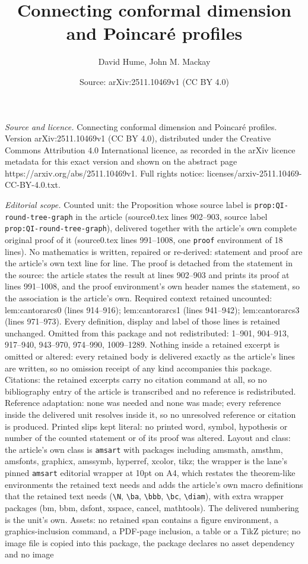\documentclass[10pt,a4paper]{amsart}
\title[Connecting conformal dimension and Poincar\'e profiles]{Connecting conformal dimension and Poincar\'e profiles}
\author{David Hume, John M. Mackay}
\date{Source: arXiv:2511.10469v1 (CC BY 4.0)}
\begin{document}
\maketitle

\noindent\emph{Source and licence.} Connecting conformal dimension and Poincar\'e profiles. Version arXiv:2511.10469v1 (CC BY 4.0), distributed under the Creative Commons Attribution 4.0 International licence, as recorded in the arXiv licence metadata for this exact version and shown on the abstract page https://arxiv.org/abs/2511.10469v1. Full rights notice: licenses/arxiv-2511.10469-CC-BY-4.0.txt.\par\smallskip

\noindent\textit{Editorial scope.} Counted unit: the Proposition whose source label is \texttt{prop:QI-round-tree-graph} in the article (source0.tex lines 902--903, source label \texttt{prop:QI-round-tree-graph}), delivered together with the article's own complete original proof of it (source0.tex lines 991--1008, one \texttt{proof} environment of 18 lines). No mathematics is written, repaired or re-derived: statement and proof are the article's own text line for line. The proof is detached from the statement in the source: the article states the result at lines 902--903 and prints its proof at lines 991--1008, and the proof environment's own header names the statement, so the association is the article's own. Required context retained uncounted: lem:cantorarcs0 (lines 914--916); lem:cantorarcs1 (lines 941--942); lem:cantorarcs3 (lines 971--973). Every definition, display and label of those lines is retained unchanged. Omitted from this package and not redistributed: 1--901, 904--913, 917--940, 943--970, 974--990, 1009--1289. Nothing inside a retained excerpt is omitted or altered: every retained body is delivered exactly as the article's lines are written, so no omission receipt of any kind accompanies this package. Citations: the retained excerpts carry no citation command at all, so no bibliography entry of the article is transcribed and no reference is redistributed. Reference adaptation: none was needed and none was made; every reference inside the delivered unit resolves inside it, so no unresolved reference or citation is produced. Printed slips kept literal: no printed word, symbol, hypothesis or number of the counted statement or of its proof was altered. Layout and class: the article's own class is \texttt{amsart} with packages including amsmath, amsthm, amsfonts, graphicx, amssymb, hyperref, xcolor, tikz; the wrapper is the lane's pinned \texttt{amsart} editorial wrapper at 10pt on A4, which restates the theorem-like environments the retained text needs and adds the article's own macro definitions that the retained text needs (\texttt{\textbackslash N}, \texttt{\textbackslash ba}, \texttt{\textbackslash bbb}, \texttt{\textbackslash bc}, \texttt{\textbackslash diam}), with extra wrapper packages (bm, bbm, dsfont, xspace, cancel, mathtools). The delivered numbering is the unit's own. Assets: no retained span contains a figure environment, a graphics-inclusion command, a PDF-page inclusion, a table or a TikZ picture; no image file is copied into this package, the package declares no asset dependency and no image 
\end{document}
